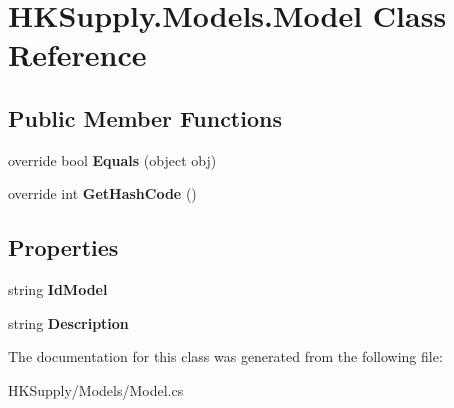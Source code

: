 \hypertarget{class_h_k_supply_1_1_models_1_1_model}{}\section{H\+K\+Supply.\+Models.\+Model Class Reference}
\label{class_h_k_supply_1_1_models_1_1_model}
\subsection*{Public Member Functions}
\begin{DoxyCompactItemize}
\item 
\mbox{\label{class_h_k_supply_1_1_models_1_1_model_a46e4de8a5fbba208d98390197de328a6}} 
override bool {\bfseries Equals} (object obj)
\item 
\mbox{\label{class_h_k_supply_1_1_models_1_1_model_a5e5f0e15c30ad3467eeeaf28a845999d}} 
override int {\bfseries Get\+Hash\+Code} ()
\end{DoxyCompactItemize}
\subsection*{Properties}
\begin{DoxyCompactItemize}
\item 
\mbox{\label{class_h_k_supply_1_1_models_1_1_model_a2a339fedc6b0f3b6b7f46f91a63935f6}} 
string {\bfseries Id\+Model}
\item 
\mbox{\label{class_h_k_supply_1_1_models_1_1_model_ae176b5c4abdd92d5caec3d7c134b98dd}} 
string {\bfseries Description}
\end{DoxyCompactItemize}


The documentation for this class was generated from the following file\+:\begin{DoxyCompactItemize}
\item 
H\+K\+Supply/\+Models/Model.\+cs\end{DoxyCompactItemize}
